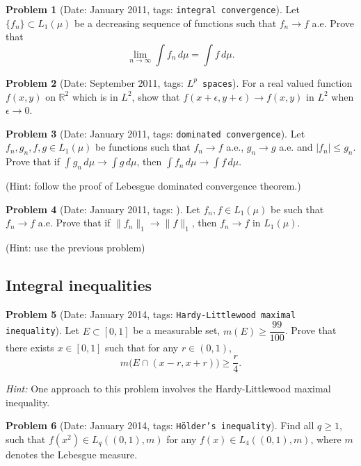 \documentclass[11pt, notitlepage]{article}
\theoremstyle{definition}
\theoremstyle{definition}
\theoremstyle{definition}
\newtheorem{probstate}{Problem}
\theoremstyle{remark}
\newenvironment{problem}[2]{
    \begin{probstate}[Date: #1, tags: \texttt{#2}]
}
{
  \end{probstate}
}
\begin{document}
\begin{problem}{January 2011}{integral convergence}
  Let $\{f_n\} \subset L_1(\mu)$ be a decreasing sequence of functions such that $f_n \to f$ a.e.
  Prove that
    \[
      \lim_{n \to \infty} \int f_n \, d \mu = \int f \, d \mu.
    \]
\end{problem}

\begin{problem}{September 2011}{$L^p$ spaces}
  For a real valued function $f(x,y)$ on $\mathbb R^2$ which is in $L^2$, show that $f(x+\epsilon,y+\epsilon) \rightarrow f(x,y)$ in $L^2$ when $\epsilon \rightarrow 0$.
\end{problem}

\begin{problem}{January 2011}{dominated convergence}
  Let $f_n,g_n,f,g \in L_1(\mu)$ be functions such that
    $f_n \to f$ a.e., $g_n \to g$ a.e. and $|f_n| \le g_n$. Prove
    that if $\int g_n \, d \mu \to \int g \, d \mu$, then
    $\int f_n \, d \mu \to \int f \, d \mu$.

    (Hint: follow the proof of Lebesgue dominated convergence
    theorem.)
\end{problem}

\begin{problem}{January 2011}{}
  Let $f_n,f \in L_1(\mu)$ be such that $f_n \to f$ a.e.
    Prove that if \newline
    $\|f_n\|_1 \to \|f\|_1$,
    then $f_n \to f$ in $L_1(\mu)$.

    (Hint: use the previous problem)

\end{problem}

\subsection{Integral inequalities}

\begin{problem}{January 2014}{Hardy-Littlewood maximal inequality}
Let $E \subset [0,1]$ be a measurable set, $m(E) \ge \dfrac{99}{100}$. Prove that there exists $x \in [0,1]$ such that for any $r \in (0,1)$,
    \[
      m \big( E \cap (x-r,x+r) \big) \ge \frac{r}{4}.
    \]

\emph{Hint:} One approach to this problem involves the Hardy-Littlewood maximal inequality.
\end{problem}

\begin{problem}{January 2014}{H\"older's inequality}
Find all $q \ge 1$, such that $f(x^2) \in L_q((0,1),m)$ for any $f(x)  \in L_4((0,1),m)$, where $m$ denotes the Lebesgue measure.
\end{problem}
\end{document}

